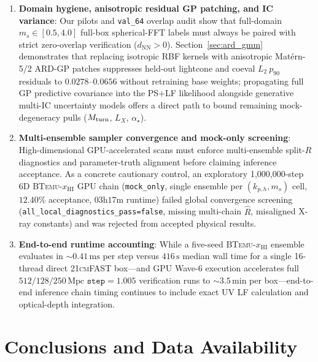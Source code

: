 \documentclass[aps,prd,reprint,superscriptaddress,nofootinbib,amsmath,amssymb,floatfix,longbibliography]{revtex4-2}
\begin{document}
\begin{enumerate}
\item \textbf{Domain hygiene, anisotropic residual GP patching, and IC variance}: Our pilots and \texttt{val\_64} overlap audit show that full-domain $m_s \in [0.5, 4.0]$ full-box spherical-FFT labels must always be paired with strict zero-overlap verification ($d_{\mathrm{NN}}>0$). Section~\ref{sec:ard_gmm} demonstrates that replacing isotropic RBF kernels with anisotropic Mat\'ern-5/2 ARD-GP patches suppresses held-out lightcone and coeval $L_2\ p_{90}$ residuals to $0.0278\text{--}0.0656$ without retraining base weights; propagating full GP predictive covariance into the PS+LF likelihood alongside generative multi-IC uncertainty models \cite{Breitman2026} offers a direct path to bound remaining mock-degeneracy pulls ($M_{\rm turn}$, $L_X$, $\alpha_\star$).
\item \textbf{Multi-ensemble sampler convergence and mock-only screening}: High-dimensional GPU-accelerated scans must enforce multi-ensemble split-$\widehat{R}$ diagnostics \cite{Vehtari2021} and parameter-truth alignment before claiming inference acceptance. As a concrete cautionary control, an exploratory 1,000,000-step 6D \textsc{BTemu}-$x_{\mathrm{HI}}$ GPU chain (\texttt{mock\_only}, single ensemble per $(k_{p,h}, m_s)$ cell, $12.40\%$ acceptance, $03\mathrm{h}17\mathrm{m}$ runtime) failed global convergence screening (\texttt{all\_local\_diagnostics\_pass=false}, missing multi-chain $\widehat{R}$, misaligned X-ray constants) and was rejected from accepted physical results.
\item \textbf{End-to-end runtime accounting}: While a five-seed \textsc{BTemu}-$x_{\mathrm{HI}}$ ensemble evaluates in $\sim 0.41\,\mathrm{ms}$ per step versus $416\,\mathrm{s}$ median wall time for a single 16-thread direct \textsc{21cmFAST} box---and GPU Wave-6 execution accelerates full $512/128/250\,\mathrm{Mpc}$ $\texttt{step}=1.005$ verification runs to $\sim 3.5\,\mathrm{min}$ per box---end-to-end inference chain timing continues to include exact UV LF calculation and optical-depth integration.
\end{enumerate}

\section{Conclusions and Data Availability}\label{sec:conclusions}
\end{document}
